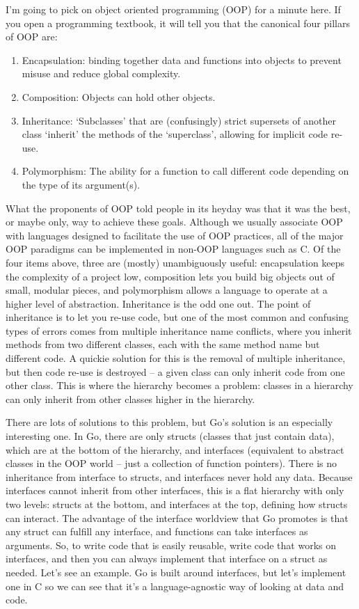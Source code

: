 \documentclass[12pt]{article}
\begin{document}
I'm going to pick on object oriented programming (OOP) for a minute here. If you open a programming textbook, it will tell you that the canonical four
pillars of OOP are:

\begin{enumerate}
    \item Encapsulation: binding together data and functions into objects to prevent misuse and reduce global complexity.
    \item Composition: Objects can hold other objects.
    \item Inheritance: `Subclasses' that are (confusingly) strict supersets of another class `inherit' the methods of the `superclass', allowing for implicit code re-use.
    \item Polymorphism: The ability for a function to call different code depending on the type of its argument(s).
\end{enumerate}

What the proponents of OOP told people in its heyday was that it was the
best, or maybe only, way to achieve these goals. Although we usually associate
OOP with languages designed to facilitate the use of OOP practices, all of the
major OOP paradigms can be implemented in non-OOP languages such as C. Of the
four items above, three are (mostly) unambiguously useful: encapsulation keeps
the complexity of a project low, composition lets you build big objects out of
small, modular pieces, and polymorphism allows a language to operate at a
higher level of abstraction.  Inheritance is the odd one out. The point of
inheritance is to let you re-use code, but one of the most common and confusing
types of errors comes from multiple inheritance name conflicts, where you
inherit methods from two different classes, each with the same method name but
different code. A quickie solution for this is the removal of multiple
inheritance, but then code re-use is destroyed -- a given class can only
inherit code from one other class.  This is where the hierarchy becomes a
problem: classes in a hierarchy can only inherit from other classes higher in
the hierarchy.

There are lots of solutions to this problem, but Go's solution is an especially
interesting one.  In Go, there are only structs (classes that just contain
data), which are at the bottom of the hierarchy, and interfaces (equivalent to
abstract classes in the OOP world -- just a collection of function pointers).
There is no inheritance from interface to structs, and interfaces never hold
any data. Because interfaces cannot inherit from other interfaces, this is a
flat hierarchy with only two levels: structs at the bottom, and interfaces at
the top, defining how structs can interact.  The advantage of the interface
worldview that Go promotes is that any struct can fulfill any interface, and
functions can take interfaces as arguments. So, to write code that is easily
reusable, write code that works on interfaces, and then you can always
implement that interface on a struct as needed. Let's see an example. Go is
built around interfaces, but let's implement one in C so we can see that it's a
language-agnostic way of looking at data and code.
\end{document}
